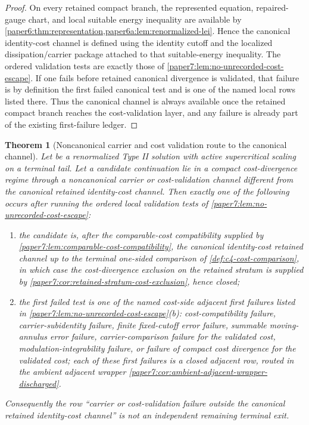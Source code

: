 \documentclass[11pt]{amsart}
\def\({}%
\def\){}%
\theoremstyle{plain}
\newtheorem{theorem}{Theorem}[section]
\theoremstyle{definition}
\theoremstyle{remark}
\begin{document}
\begin{proof}
On every retained compact branch, the represented equation, repaired-gauge
chart, and local suitable energy inequality are available by
\cref{paper6:thm:representation,paper6a:lem:renormalized-lei}.  Hence the
canonical identity-cost channel is defined using the identity cutoff and the
localized dissipation/carrier package attached to that suitable-energy
inequality.  The ordered validation tests are exactly those of
\cref{paper7:lem:no-unrecorded-cost-escape}.  If one fails before retained
canonical divergence is validated, that failure is by definition the first
failed canonical test and is one of the named local rows listed there.  Thus
the canonical channel is always available once the retained compact branch
reaches the cost-validation layer, and any failure is already part of the
existing first-failure ledger.
\end{proof}

\begin{theorem}[Noncanonical carrier and cost validation route to the canonical channel]
\label{paper6:thm:noncanonical-cost-routing-closed}
Let \(\omega\) be a renormalized Type II solution with active supercritical
scaling on a terminal tail.  Let a candidate continuation lie in a compact
cost-divergence regime through a noncanonical carrier or cost-validation
channel different from the canonical retained identity-cost channel.  Then
exactly one of the following occurs after running the ordered local
validation tests of \cref{paper7:lem:no-unrecorded-cost-escape}:
\begin{enumerate}[label=\textup{(\alph*)}]
\item the candidate is, after the comparable-cost compatibility supplied by
\cref{paper7:lem:comparable-cost-compatibility}, the canonical
identity-cost retained channel up to the terminal one-sided comparison of
\cref{def:c4-cost-comparison}, in which case the cost-divergence exclusion
on the retained stratum is supplied by
\cref{paper7:cor:retained-stratum-cost-exclusion}, hence closed;
\item the first failed test is one of the named cost-side adjacent first
failures listed in
\cref{paper7:lem:no-unrecorded-cost-escape}\textup{(b)}: cost-compatibility
failure, carrier-subidentity failure, finite fixed-cutoff error failure,
summable moving-annulus error failure, carrier-comparison failure for the
validated cost, modulation-integrability failure, or failure of compact cost
divergence for the validated cost; each of these first failures is a closed
adjacent row, routed in the ambient adjacent wrapper
\cref{paper7:cor:ambient-adjacent-wrapper-discharged}.
\end{enumerate}
Consequently the row ``carrier or cost-validation failure outside the
canonical retained identity-cost channel'' is not an independent remaining
terminal exit.
\end{theorem}
\end{document}
